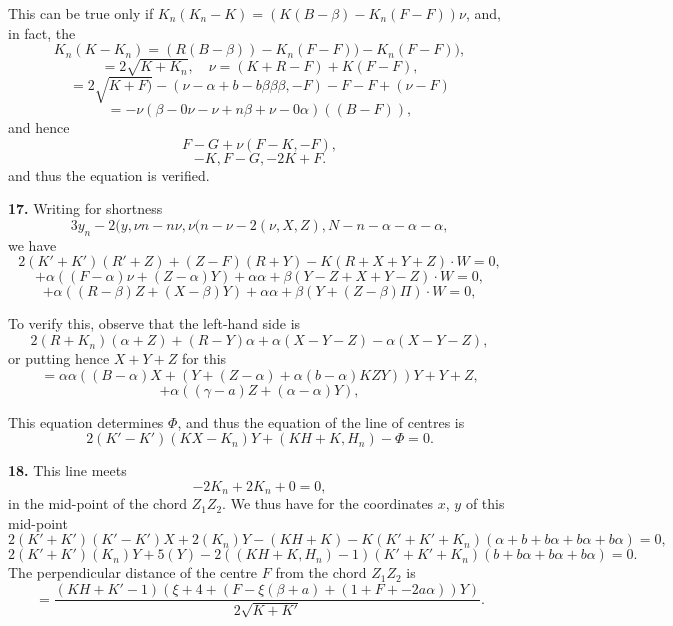 \documentclass[11pt,a4paper]{book}
\begin{document}
This can be true only if $K_n(K_n - K) = (K(B - \beta) - K_n(F - F))\nu$, and, in fact, the
\[
K_n(K - K_n) = (R(B - \beta)) - K_n(F - F)) - K_n(F - F)),
\]
\[
= 2\sqrt{K + K_n}, \quad \nu = (K + R - F) + K(F - F),
\]
\[
= 2\sqrt{K + F)} - (\nu - \alpha + b - b\beta\beta\beta, - F) - F - F + (\nu - F)
\]
\[
= -\nu(\beta - 0\nu - \nu + n\beta + \nu - 0\alpha)((B - F)),
\]
and hence
\[
F - G + \nu(F - K, - F),
\]
\[
- K, F - G, - 2K + F.
\]
and thus the equation is verified.

\textbf{17.} Writing for shortness
\[
3y_n - 2(y, \nu n - n\nu, \nu(n - \nu - 2(\nu, X, Z), N - n - \alpha - \alpha - \alpha,
\]
we have
\[
2(K' + K')(R' + Z) + (Z - F)(R + Y) - K(R + X + Y + Z) \cdot W = 0,
\]
\[
+ \alpha((F - \alpha)\nu + (Z - \alpha)Y) + \alpha\alpha + \beta(Y - Z + X + Y - Z) \cdot W = 0,
\]
\[
+ \alpha((R - \beta)Z + (X - \beta)Y) + \alpha\alpha + \beta(Y + (Z - \beta)\Pi) \cdot W = 0,
\]

To verify this, observe that the left-hand side is
\[
2(R + K_n)(\alpha + Z) + (R - Y)\alpha + \alpha(X - Y - Z) - \alpha(X - Y - Z),
\]
or putting hence $X + Y + Z$ for this
\[
= \alpha\alpha((B - \alpha)X + (Y + (Z - \alpha) + \alpha(b - \alpha)KZ Y) ) Y + Y + Z,
\]
\[
+ \alpha((\gamma - a)Z + (\alpha - \alpha)Y),
\]

This equation determines $\Phi$, and thus the equation of the line of centres is
\[
2(K' - K')(KX - K_n)Y + (KH + K, H_n) - \Phi = 0.
\]

\textbf{18.} This line meets
\[
- 2K_n + 2K_n + 0 = 0,
\]
in the mid-point of the chord $Z_1 Z_2$. We thus have for the coordinates $x$, $y$ of this mid-point
\[
2(K' + K')(K' - K')X + 2(K_n)Y - (KH + K) - K(K' + K' + K_n)(\alpha + b + b\alpha + b\alpha + b\alpha) = 0,
\]
\[
2(K' + K')(K_n)Y + 5(Y) - 2((KH + K, H_n) - 1)(K' + K' + K_n)(b + b\alpha + b\alpha + b\alpha) = 0.
\]
The perpendicular distance of the centre $F$ from the chord $Z_1 Z_2$ is
\[
= \frac{(KH + K' - 1)(\xi + 4 + (F - \xi(\beta + a) + (1 + F + - 2a\alpha))Y)}{2\sqrt{K + K'}}.
\]
\end{document}
